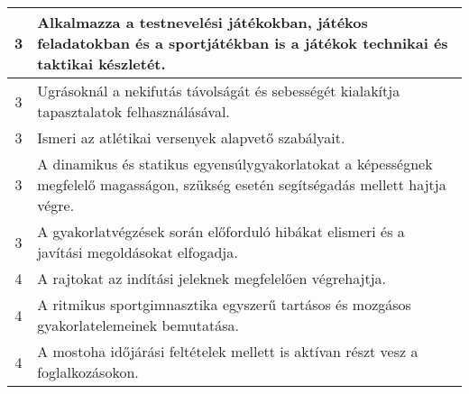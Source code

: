 \begin{longtable}{c | p{12cm} }
                                
                                          3 &  Alkalmazza a testnevelési játékokban, játékos feladatokban és a sportjátékban is a játékok technikai és taktikai készletét. \\ \hline
                                          3 &  Ugrásoknál a nekifutás távolságát és sebességét kialakítja tapasztalatok felhasználásával. \\ \hline
                                          3 &  Ismeri az atlétikai versenyek alapvető szabályait. \\ \hline
                                          3 &  A dinamikus és statikus egyensúlygyakorlatokat a képességnek megfelelő magasságon, szükség esetén segítségadás mellett hajtja végre. \\ \hline
                                          3 &  A gyakorlatvégzések során előforduló hibákat elismeri és a javítási megoldásokat elfogadja. \\ \hline
                                      
                                
                                          4 &  A rajtokat az indítási jeleknek megfelelően végrehajtja. \\ \hline
                                          4 &  A ritmikus sportgimnasztika egyszerű tartásos és mozgásos gyakorlatelemeinek bemutatása. \\ \hline
                                          4 &  A mostoha időjárási feltételek mellett is aktívan részt vesz a foglalkozásokon. \\ \hline
                                      
                        \end{longtable}
            \clearpage

